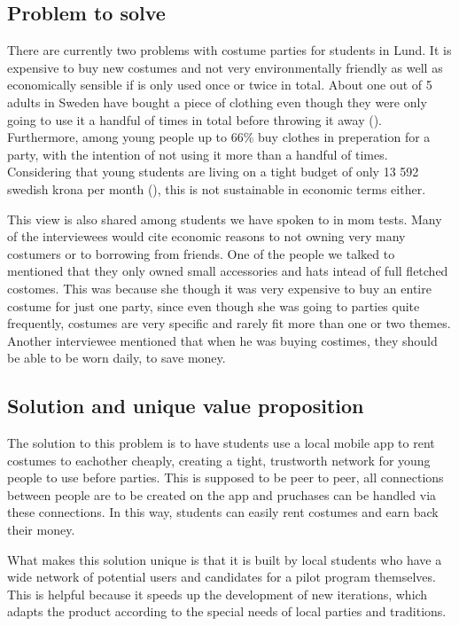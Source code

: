 \documentclass[a4paper, titlepage]{article}
\begin{document}
\subsection{Problem to solve}
There are currently two problems with costume parties for students in Lund. It is expensive to buy new costumes and not very environmentally friendly as well as economically sensible if is only used once or twice in total. About one out of 5 adults in Sweden have bought a piece of clothing even though they were only going to use it a handful of times in total before throwing it away (\cite{naturskyddsforeningen}). Furthermore, among young people up to 66\% buy clothes in preperation for a party, with the intention of not using it more than a handful of times. Considering that young students are living on a tight budget of only 13 592 swedish krona per month (\cite{csn}), this is not sustainable in economic terms either.

This view is also shared among students we have spoken to in mom tests. Many of the interviewees would cite economic reasons to not owning very many costumers or to borrowing from friends. One of the people we talked to mentioned that they only owned small accessories and hats intead of full fletched costomes. This was because she though it was very expensive to buy an entire costume for just one party, since even though she was going to parties quite frequently, costumes are very specific and rarely fit more than one or two themes. Another interviewee mentioned that when he was buying costimes, they should be able to be worn daily, to save money.

\subsection{Solution and unique value proposition}
The solution to this problem is to have students use a local mobile app to rent costumes to eachother cheaply, creating a tight, trustworth network for young people to use before parties. This is supposed to be peer to peer, all connections between people are to be created on the app and pruchases can be handled via these connections. In this way, students can easily rent costumes and earn back their money. 

What makes this solution unique is that it is built by local students who have a wide network of potential users and candidates for a pilot program themselves. This is helpful because it speeds up the development of new iterations, which adapts the product according to the special needs of local parties and traditions.
\end{document}
